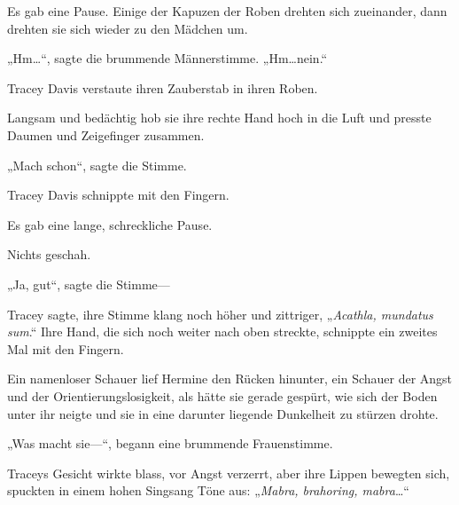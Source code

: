 Es gab eine Pause. Einige der Kapuzen der Roben drehten sich zueinander, dann drehten sie sich wieder zu den Mädchen um.

„Hm…“, sagte die brummende Männerstimme.
„Hm…nein.“

Tracey Davis verstaute ihren Zauberstab in ihren Roben.

Langsam und bedächtig hob sie ihre rechte Hand hoch in die Luft und presste Daumen und Zeigefinger zusammen.

„Mach schon“, sagte die Stimme.

Tracey Davis schnippte mit den Fingern.

Es gab eine lange, schreckliche Pause.

Nichts geschah.

„Ja, gut“, sagte die Stimme—

Tracey sagte, ihre Stimme klang noch höher und zittriger, „\emph{Acathla, mundatus sum}.“ Ihre Hand, die sich noch weiter nach oben streckte, schnippte ein zweites Mal mit den Fingern.

Ein namenloser Schauer lief Hermine den Rücken hinunter, ein Schauer der Angst und der Orientierungslosigkeit, als hätte sie gerade gespürt, wie sich der Boden unter ihr neigte und sie in eine darunter liegende Dunkelheit zu stürzen drohte.

„Was macht sie—“, begann eine brummende Frauenstimme.

Traceys Gesicht wirkte blass, vor Angst verzerrt, aber ihre Lippen bewegten sich, spuckten in einem hohen Singsang Töne aus: „\emph{Mabra, brahoring, mabra}…“

